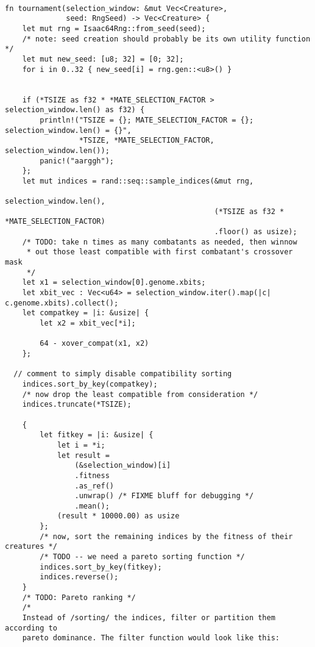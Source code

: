 \documentclass[11pt]{article}
\begin{document}
\lstset{language=rust,label=org001a598,caption= ,captionpos=b,numbers=none}
\begin{lstlisting}

fn tournament(selection_window: &mut Vec<Creature>,
              seed: RngSeed) -> Vec<Creature> {
    let mut rng = Isaac64Rng::from_seed(seed);
    /* note: seed creation should probably be its own utility function */
    let mut new_seed: [u8; 32] = [0; 32];
    for i in 0..32 { new_seed[i] = rng.gen::<u8>() }


    if (*TSIZE as f32 * *MATE_SELECTION_FACTOR > selection_window.len() as f32) {
        println!("TSIZE = {}; MATE_SELECTION_FACTOR = {}; selection_window.len() = {}",
                 *TSIZE, *MATE_SELECTION_FACTOR, selection_window.len());
        panic!("aarggh");
    };
    let mut indices = rand::seq::sample_indices(&mut rng,
                                                selection_window.len(),
                                                (*TSIZE as f32 * *MATE_SELECTION_FACTOR)
                                                .floor() as usize);
    /* TODO: take n times as many combatants as needed, then winnow
     * out those least compatible with first combatant's crossover mask
     */
    let x1 = selection_window[0].genome.xbits;
    let xbit_vec : Vec<u64> = selection_window.iter().map(|c| c.genome.xbits).collect();
    let compatkey = |i: &usize| {
        let x2 = xbit_vec[*i];

        64 - xover_compat(x1, x2)
    };

  // comment to simply disable compatibility sorting
    indices.sort_by_key(compatkey);
    /* now drop the least compatible from consideration */
    indices.truncate(*TSIZE);

    {
        let fitkey = |i: &usize| {
            let i = *i;
            let result = 
                (&selection_window)[i]
                .fitness
                .as_ref()
                .unwrap() /* FIXME bluff for debugging */
                .mean();
            (result * 10000.00) as usize
        };
        /* now, sort the remaining indices by the fitness of their creatures */
        /* TODO -- we need a pareto sorting function */
        indices.sort_by_key(fitkey);
        indices.reverse();
    }
    /* TODO: Pareto ranking */
    /*
    Instead of /sorting/ the indices, filter or partition them according to
    pareto dominance. The filter function would look like this:


\end{lstlisting}
\end{document}
